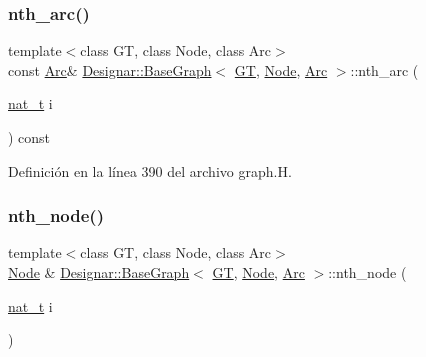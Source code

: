 \subsubsection{\texorpdfstring{nth\+\_\+arc()}{nth\_arc()}\hspace{0.1cm}{\footnotesize\ttfamily [2/2]}}
{\footnotesize\ttfamily template$<$class GT, class Node, class Arc$>$ \\
const \hyperlink{namespace_designar_a3f55fb5513d62ff47cbc8f72b8e95d6f}{Arc}\& \hyperlink{class_designar_1_1_base_graph}{Designar\+::\+Base\+Graph}$<$ \hyperlink{demo-buildgraph_8_c_a3001c40d2c31ca87ed96cd7d1334a55e}{GT}, \hyperlink{namespace_designar_a5af326c65aa2bd26b26c410f2030d09e}{Node}, \hyperlink{namespace_designar_a3f55fb5513d62ff47cbc8f72b8e95d6f}{Arc} $>$\+::nth\+\_\+arc (\begin{DoxyParamCaption}\item[{\hyperlink{namespace_designar_aa72662848b9f4815e7bf31a7cf3e33d1}{nat\+\_\+t}}]{i }\end{DoxyParamCaption}) const\hspace{0.3cm}{\ttfamily [inline]}}



Definición en la línea 390 del archivo graph.\+H.

\mbox{\label{class_designar_1_1_base_graph_ae4b7d560477f0b860d127a6ace6956e5}} 
\subsubsection{\texorpdfstring{nth\+\_\+node()}{nth\_node()}\hspace{0.1cm}{\footnotesize\ttfamily [1/2]}}
{\footnotesize\ttfamily template$<$class GT, class Node, class Arc$>$ \\
\hyperlink{namespace_designar_a5af326c65aa2bd26b26c410f2030d09e}{Node} \& \hyperlink{class_designar_1_1_base_graph}{Designar\+::\+Base\+Graph}$<$ \hyperlink{demo-buildgraph_8_c_a3001c40d2c31ca87ed96cd7d1334a55e}{GT}, \hyperlink{namespace_designar_a5af326c65aa2bd26b26c410f2030d09e}{Node}, \hyperlink{namespace_designar_a3f55fb5513d62ff47cbc8f72b8e95d6f}{Arc} $>$\+::nth\+\_\+node (\begin{DoxyParamCaption}\item[{\hyperlink{namespace_designar_aa72662848b9f4815e7bf31a7cf3e33d1}{nat\+\_\+t}}]{i }\end{DoxyParamCaption})\hspace{0.3cm}{\ttfamily [inline]}}



